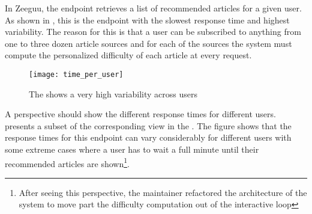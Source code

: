 
In Zeeguu, the \epFeedItems endpoint retrieves a list of recommended articles for a given user. As shown in , this is the endpoint with the slowest response time and highest variability. The reason for this is that a user can be subscribed to anything from one to three dozen article sources and for each of the sources the system must compute the personalized difficulty of each article at every request. 


\begin{figure}[h!]
  \centering
  \texttt{[image: time\_per\_user]}
  \caption{The \epFeedItems shows a very high variability across users}
  \label{fig:tpu}
\end{figure}


A  perspective should show the different response times for different users.  presents a subset of the corresponding view in the \tool. The figure shows that the response times for this endpoint can vary considerably for different users with some extreme cases where a user has to wait a full minute until their recommended articles are shown\footnote{After seeing this perspective, the maintainer refactored the architecture of the system to move part the difficulty computation out of the interactive loop}.






